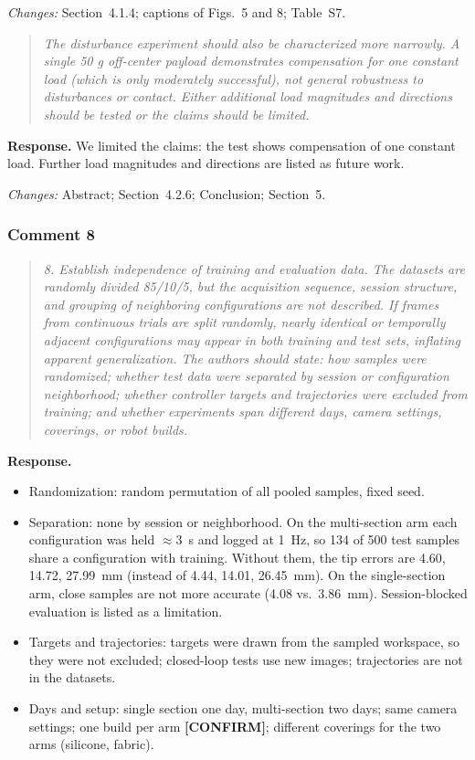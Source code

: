 \documentclass[11pt,a4paper]{article}
\newcommand{\rc}[1]{\begin{quote}\color{black!70}\itshape #1\end{quote}}
\begin{document}
\textit{Changes:} Section~4.1.4; captions of Figs.~5 and 8; Table~S7.

\rc{The disturbance experiment should also be characterized more narrowly. A single 50 g off-center payload demonstrates compensation for one constant load (which is only moderately successful), not general robustness to disturbances or contact. Either additional load magnitudes and directions should be tested or the claims should be limited.}
\textbf{Response.} We limited the claims: the test shows compensation of one constant load. Further load magnitudes and directions are listed as future work.

\textit{Changes:} Abstract; Section~4.2.6; Conclusion; Section~5.

\subsubsection*{Comment 8}

\rc{8. Establish independence of training and evaluation data. The datasets are randomly divided 85/10/5, but the acquisition sequence, session structure, and grouping of neighboring configurations are not described. If frames from continuous trials are split randomly, nearly identical or temporally adjacent configurations may appear in both training and test sets, inflating apparent generalization. The authors should state: how samples were randomized; whether test data were separated by session or configuration neighborhood; whether controller targets and trajectories were excluded from training; and whether experiments span different days, camera settings, coverings, or robot builds.}
\textbf{Response.} \begin{itemize}
\item Randomization: random permutation of all pooled samples, fixed seed.
\item Separation: none by session or neighborhood. On the multi-section arm each configuration was held $\approx 3$~s and logged at 1~Hz, so 134 of 500 test samples share a configuration with training. Without them, the tip errors are 4.60, 14.72, 27.99~mm (instead of 4.44, 14.01, 26.45~mm). On the single-section arm, close samples are not more accurate (4.08 vs.\ 3.86~mm). Session-blocked evaluation is listed as a limitation.
\item Targets and trajectories: targets were drawn from the sampled workspace, so they were not excluded; closed-loop tests use new images; trajectories are not in the datasets.
\item Days and setup: single section one day, multi-section two days; same camera settings; one build per arm \textbf{[CONFIRM]}; different coverings for the two arms (silicone, fabric).
\end{itemize}
\end{document}

